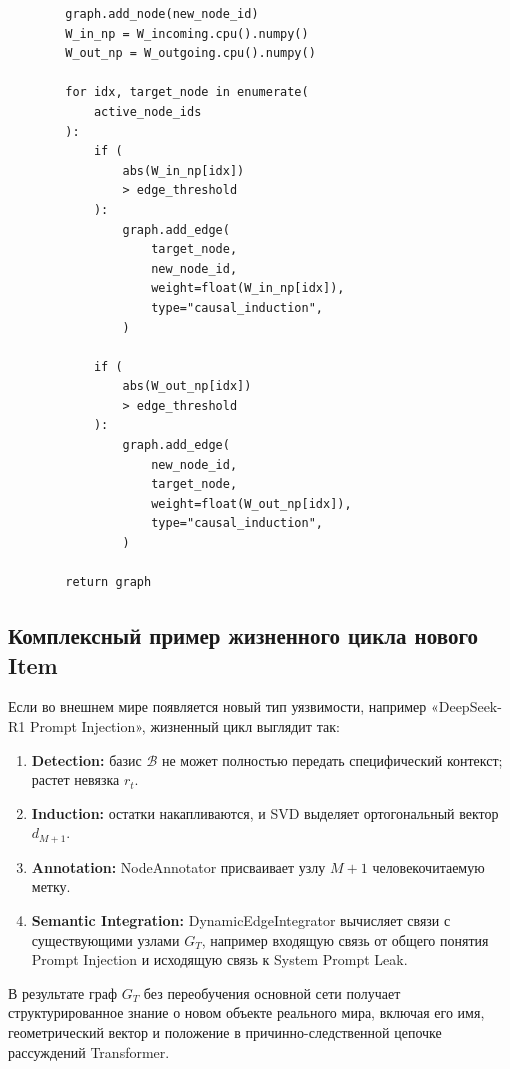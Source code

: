 \documentclass[11pt,a4paper]{article}
\begin{document}
\begin{lstlisting}
        graph.add_node(new_node_id)
        W_in_np = W_incoming.cpu().numpy()
        W_out_np = W_outgoing.cpu().numpy()

        for idx, target_node in enumerate(
            active_node_ids
        ):
            if (
                abs(W_in_np[idx])
                > edge_threshold
            ):
                graph.add_edge(
                    target_node,
                    new_node_id,
                    weight=float(W_in_np[idx]),
                    type="causal_induction",
                )

            if (
                abs(W_out_np[idx])
                > edge_threshold
            ):
                graph.add_edge(
                    new_node_id,
                    target_node,
                    weight=float(W_out_np[idx]),
                    type="causal_induction",
                )

        return graph
\end{lstlisting}

\fi
\subsection*{Комплексный пример жизненного цикла нового Item}

Если во внешнем мире появляется новый тип уязвимости, например «DeepSeek-R1 Prompt Injection», жизненный цикл выглядит так:

\begin{enumerate}
    \item \textbf{Detection:} базис $\mathcal{B}$ не может полностью передать специфический контекст; растет невязка $r_t$.
    \item \textbf{Induction:} остатки накапливаются, и SVD выделяет ортогональный вектор $d_{M+1}$.
    \item \textbf{Annotation:} NodeAnnotator присваивает узлу $M+1$ человекочитаемую метку.
    \item \textbf{Semantic Integration:} DynamicEdgeIntegrator вычисляет связи с существующими узлами $G_T$, например входящую связь от общего понятия Prompt Injection и исходящую связь к System Prompt Leak.
\end{enumerate}

В результате граф $G_T$ без переобучения основной сети получает структурированное знание о новом объекте реального мира, включая его имя, геометрический вектор и положение в причинно-следственной цепочке рассуждений Transformer.
\end{document}
